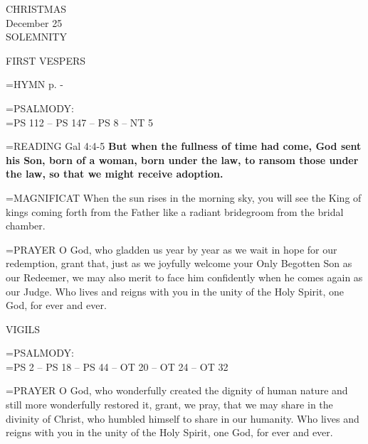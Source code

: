 \begin{center}\normalsize CHRISTMAS\\
\footnotesize December 25\\
\footnotesize SOLEMNITY\\
\end{center}

\begin{flushleft}\normalsize FIRST VESPERS\\\end{flushleft}

\hangindent=\parindent \small{\uppercase{HYMN} p. \pageref{christmas:firstHymn}-\pageref{christmas:lastHymn}\\}

\hangindent=\parindent \small{PSALMODY:}\\
\hangindent=\parindent  PS 112 -- PS 147 -- PS 8 -- NT 5\vspace{0.5em}

\hangindent=\parindent \small{\uppercase{READING}}    Gal 4:4-5 \textbf{   But when the fullness of time had come, God sent his Son, born of a woman, born under the law, to ransom those under the law, so that we might receive adoption.\\}

\hangindent=\parindent \small{MAGNIFICAT 	When the sun rises in the morning sky, you will see the King of kings coming forth from the Father like a radiant bridegroom from the bridal chamber.\\}

\hangindent=\parindent \small{PRAYER 	O God, who gladden us year by year as we wait in hope for our redemption, grant that, just as we joyfully welcome your Only Begotten Son as our Redeemer, we may also merit to face him confidently when he comes again as our Judge. Who lives and reigns with you in the unity of the Holy Spirit, one God, for ever and ever.}

\begin{flushleft}\normalsize VIGILS\\\end{flushleft}

\hangindent=\parindent \small{PSALMODY:}\\
\hangindent=\parindent  PS 2 -- PS 18 -- PS 44 -- OT 20 -- OT 24 -- OT 32\vspace{0.5em}

\hangindent=\parindent \small{PRAYER 	O God, who wonderfully created the dignity of human nature and still more wonderfully restored it, grant, we pray, that we may share in the divinity of Christ, who humbled himself to share in our humanity. Who lives and reigns with you in the unity of the Holy Spirit, one God, for ever and ever.}

